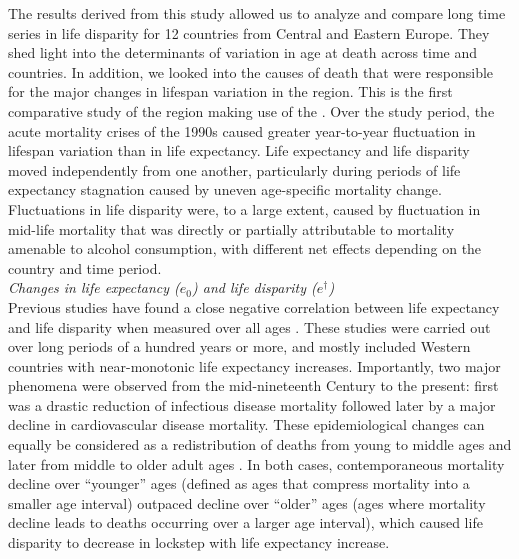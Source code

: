 \documentclass{article}
\begin{document}
\begin{spacing}{1.5}
The results derived from this study allowed us to analyze and compare long time series in life disparity for 12 countries from Central and Eastern Europe. They shed light into the determinants of variation in age at death across time and countries. In addition, \textcolor[rgb]{1,0,0}{we looked into the causes of death that were responsible for the major changes in lifespan variation in the region}. This is the first comparative study of the region making use of the \citet{HcO}. Over the study period, the acute mortality crises of the 1990s caused greater year-to-year fluctuation in lifespan variation than in life expectancy. Life expectancy and life disparity moved independently from one another, particularly during periods of life expectancy stagnation caused by uneven age-specific mortality change. Fluctuations in life disparity were, to a large extent, caused by fluctuation in mid-life mortality that was directly or partially attributable to mortality amenable to alcohol consumption, with different net effects depending on the country and time period. \\

 
\emph{Changes in life expectancy ($e_0$) and life disparity ($e^\dagger$)}\\

Previous studies have found a close negative correlation between life expectancy and life disparity when measured over all ages  \citep{ wilmoth1999,vaupel2011,colchero2016emergence}. These studies were carried out over long periods of a hundred years or more, and mostly included Western countries with near-monotonic life expectancy increases. Importantly, two major phenomena were observed from the mid-nineteenth Century to the present: first was a drastic reduction of infectious disease mortality followed later by a major decline in cardiovascular disease mortality. These epidemiological changes can equally be considered as a redistribution of deaths from young to middle ages and later from middle to older adult ages \citep{robine2001redefining}. In both cases, contemporaneous mortality decline over ``younger'' ages (defined as ages that compress mortality into a smaller age interval) outpaced decline over ``older'' ages (ages where mortality decline leads to deaths occurring over a larger age interval), which caused life disparity to decrease in lockstep with life expectancy increase.\\


\end{spacing}
\end{document}
